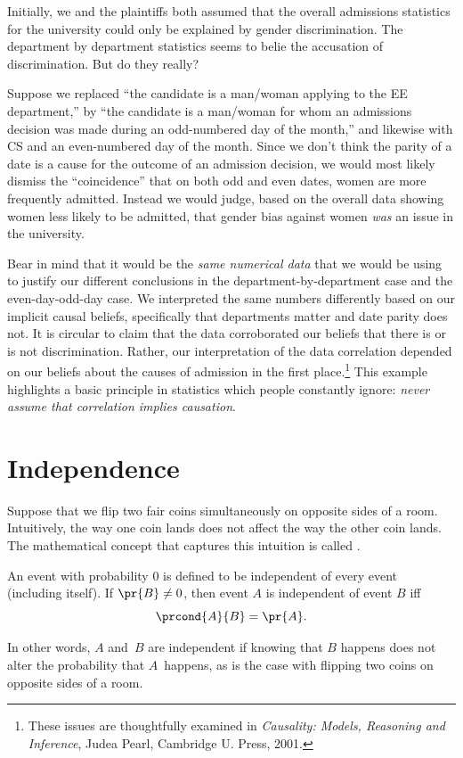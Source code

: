 Initially, we and the plaintiffs both assumed that the overall
admissions statistics for the university could only be explained by
gender discrimination.  The department by department statistics seems
to belie the accusation of discrimination.  But do they really?

Suppose we replaced ``the candidate is a man/woman applying to the EE
department,'' by ``the candidate is a man/woman for whom an admissions
decision was made during an odd-numbered day of the month,'' and
likewise with CS and an even-numbered day of the month.  Since we
don't think the parity of a date is a cause for the outcome of an
admission decision, we would most likely dismiss the ``coincidence''
that on both odd and even dates, women are more frequently admitted.
Instead we would judge, based on the overall data showing women less
likely to be admitted, that gender bias against women \emph{was} an
issue in the university.

Bear in mind that it would be the \emph{same numerical data} that we
would be using to justify our different conclusions in the
department-by-department case and the even-day-odd-day case.  We
interpreted the same numbers differently based on our implicit causal
beliefs, specifically that departments matter and date parity does
not.  It is circular to claim that the data corroborated our beliefs
that there is or is not discrimination.  Rather, our interpretation of
the data correlation depended on our beliefs about the causes of
admission in the first place.\footnote{These issues are thoughtfully
  examined in \emph{Causality: Models, Reasoning and Inference}, Judea
  Pearl, Cambridge U. Press, 2001.}  This example highlights a basic
principle in statistics which people constantly ignore: \emph{never
  assume that correlation implies causation}.
\begin{problems}
\practiceproblems
{}
\end{problems}


\section{Independence}\label{sec:independence}
Suppose that we flip two fair coins simultaneously on opposite sides
of a room.  Intuitively, the way one coin lands does not affect the
way the other coin lands.  The mathematical concept that captures
this intuition is called .
\begin{definition}\label{def:independence}
An event with probability 0 is defined to be independent of every
event (including itself).  If $\pr{B} \neq 0$, then
event $A$ is independent of event $B$ iff
\begin{equation}\label{eqn:independence}
    \prcond{A}{B} = \pr{A}.
\end{equation}
\end{definition}
In other words, $A$ and~$B$ are independent if knowing that $B$
happens does not alter the probability that $A$~happens, as is the
case with flipping two coins on opposite sides of a room.

